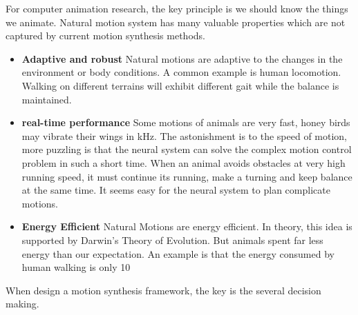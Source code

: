 For computer animation research, the key principle is we should know the things we animate.
Natural motion system has many valuable properties which are not captured by current motion synthesis methods.
\begin{itemize} 
 \item \textbf{ Adaptive and robust}
Natural motions are adaptive to the changes in the environment or body conditions. 
A common example is human locomotion. 
Walking on different terrains will exhibit different gait while the balance is maintained. 

\item \textbf{real-time performance}
Some motions of animals are very fast, honey birds may vibrate their wings in kHz.
The astonishment is to the speed of motion, more puzzling is that the neural system can solve the complex motion control problem in such a short time. 
When an animal avoids obstacles at very high running speed, 
it must continue its running, make a turning and keep balance at the same time. 
It seems easy for the neural system to plan complicate motions.
\item \textbf{Energy Efficient}
Natural Motions are energy efficient.
In theory, this idea is supported by Darwin's Theory of Evolution.
But animals spent far less energy than our expectation.
An example is that the energy consumed by human walking is only 10%
\end{itemize}
When design a motion synthesis framework, the key is the several decision making.

